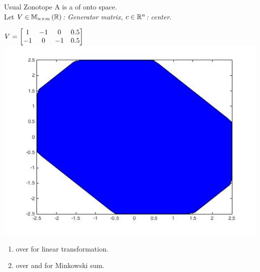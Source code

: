 \begin{frame}{Usual Zonotope}
A  is a  of 
onto  space.\\[0.5em]
%
Let  \emph{ $V\in\mathbb{M}_{n\times m}\left(\mathbb{R}\right)$: Generator matrix},
 \emph{$c\in\mathbb{R}^n$: center}.
\begin{block}{}
%
\end{block}
%
\vspace{0.5em}
%
\begin{minipage}{0.43\textwidth}
{\scriptsize $V=\left[\begin{matrix}1 &   -1 &          0 &    0.5 \\
   -1 &         0 &   -1 &    0.5\end{matrix}\right]$}
\includegraphics[scale=0.25]{figures/CZtopes/RealZonotope.jpg}
\end{minipage}
%
\pause
\vline
%
\begin{minipage}{0.55\textwidth}
\begin{enumerate}
\item {} over  for linear transformation.
%
\eqnemph{\[
A\rztope{\ptemp}{\cen}=\rztope{A\ptemp}{A\cen}.
\]}
%
\vspace{-2em}
\item {} over  and  for Minkowski sum.
%
%
\end{enumerate}
%
\end{minipage}
%
\end{frame}

